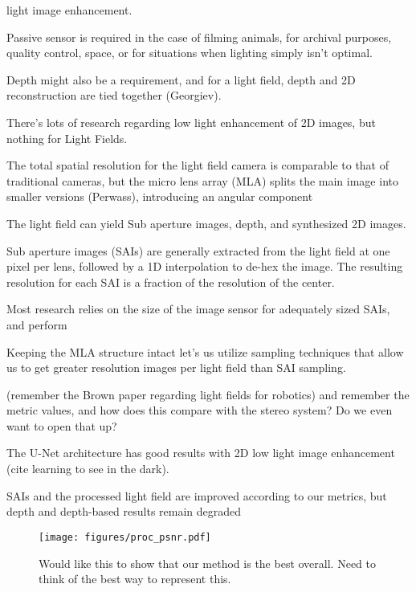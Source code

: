 \documentclass[10pt,journal,compsoc]{IEEEtran}
\begin{document}
 light image enhancement.  

Passive sensor is required in the case of filming animals, for archival purposes, quality control, space, or for situations when lighting simply isn't optimal.

Depth might also be a requirement, and for a light field, depth and 2D reconstruction are tied together (Georgiev).

There's lots of research regarding low light enhancement of 2D images, but nothing for Light Fields. 

The total spatial resolution for the light field camera is comparable to that of traditional cameras, but the micro lens array (MLA) splits the main image into smaller versions (Perwass), introducing an angular component

The light field can yield Sub aperture images, depth, and synthesized 2D images.

Sub aperture images (SAIs) are generally extracted from the light field at one pixel per lens, followed by a 1D interpolation to de-hex the image. The resulting resolution for each SAI is a fraction of the resolution of the center. 

Most research relies on the size of the image sensor for adequately sized SAIs, and perform 

Keeping the MLA structure intact let's us utilize sampling techniques that allow us to get greater resolution images per light field than SAI sampling.

(remember the Brown paper regarding light fields for robotics)  
and remember the metric values, and how does this compare with the stereo system? Do we even want to open that up?

The U-Net architecture has good results with 2D low light image enhancement (cite learning to see in the dark).

SAIs and the processed light field are improved according to our metrics, but depth and depth-based results remain degraded


\begin{figure}
\texttt{[image: figures/proc\_psnr.pdf]}
    \caption{\label{fig:fig_one} Would like this to show that our method is the best overall. Need to think of the best way to represent this.}
\end{figure}
\end{document}
